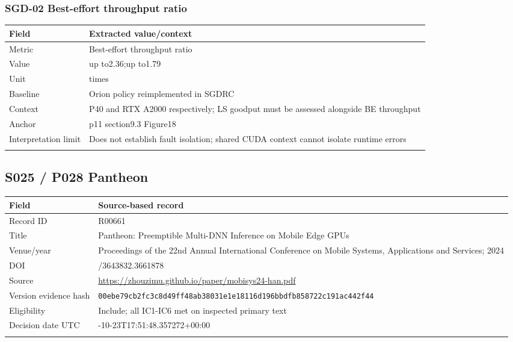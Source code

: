 \subsubsection*{SGD-02 Best-effort throughput ratio}
\begin{longtable}{>{\raggedright\arraybackslash}p{}>{\raggedright\arraybackslash}p{}}
\toprule
\textbf{Field} & \textbf{Extracted value/context}\\\midrule\endhead
Metric & Best-effort throughput ratio\\\addlinespace
Value & up to2.36;\allowbreak{}up to1.79\\\addlinespace
Unit & times\\\addlinespace
Baseline & Orion policy reimplemented in SGDRC\\\addlinespace
Context & P40 and RTX A2000 respectively;\allowbreak{} LS goodput must be assessed alongside BE throughput\\\addlinespace
Anchor & p11 section9.3 Figure18\\\addlinespace
Interpretation limit & Does not establish fault isolation;\allowbreak{} shared CUDA context cannot isolate runtime errors\\\addlinespace
\bottomrule\end{longtable}
\clearpage\subsection{S025 / P028 Pantheon}
\cite{s025}
\begin{longtable}{>{\raggedright\arraybackslash}p{}>{\raggedright\arraybackslash}p{}}
\toprule
\textbf{Field} & \textbf{Source-based record}\\\midrule\endhead
Record ID & R00661\\\addlinespace
Title & Pantheon: Preemptible Multi-DNN Inference on Mobile Edge GPUs\\\addlinespace
Venue/year & Proceedings of the 22nd Annual International Conference on Mobile Systems,\allowbreak{} Applications and Services;\allowbreak{} 2024\\\addlinespace
DOI & 10.1145/3643832.3661878\\\addlinespace
Source & \url{https://zhouzimu.github.io/paper/mobisys24-han.pdf}\\\addlinespace
Version evidence hash & \nolinkurl{00ebe79cb2fc3c8d49ff48ab38031e1e18116d196bbdfb858722c191ac442f44}\\\addlinespace
Eligibility & Include;\allowbreak{} all IC1-IC6 met on inspected primary text\\\addlinespace
Decision date UTC & 2026-10-23T17:51:48.357272+00:00\\\addlinespace
\bottomrule\end{longtable}

